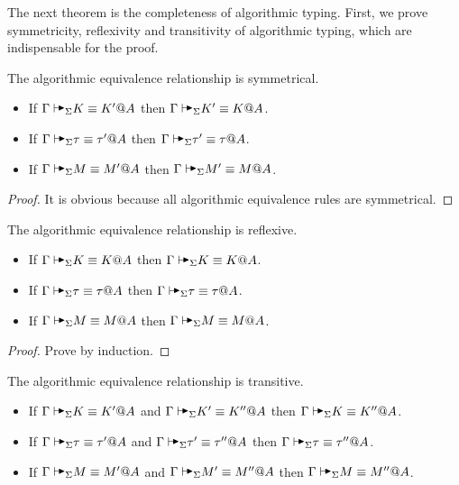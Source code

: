 The next theorem is the completeness of algorithmic typing. First, we prove
symmetricity, reflexivity and transitivity of algorithmic typing, which are
indispensable for the proof.

\begin{lemma}
    The algorithmic equivalence relationship is symmetrical.
    \label{lemma:SymmetricityinAlgorithmicEquivalence}
    \begin{itemize}
        \item If \( \G \AVS K \E K' @ A \) then \( \G \AVS K' \E K @ A \).
        \item If \( \G \AVS \tau \E \tau' @ A \) then \( \G \AVS \tau' \E \tau @ A \).
        \item If \( \G \AVS M \E M' @ A \) then \( \G \AVS M' \E M @ A \).
    \end{itemize}
\end{lemma}

\begin{proof}
    It is obvious because all algorithmic equivalence rules are symmetrical.
\end{proof}

\begin{lemma}
    The algorithmic equivalence relationship is reflexive.
    \label{lemma:ReflexivityinAlgorithmicEquivalence}
    \begin{itemize}
        \item If \( \G \AVS K \E K @ A \) then \( \G \AVS K \E K @ A \).
        \item If \( \G \AVS \tau \E \tau @ A \) then \( \G \AVS \tau \E \tau @ A \).
        \item If \( \G \AVS M \E M @ A \) then \( \G \AVS M \E M @ A \).
    \end{itemize}
\end{lemma}

\begin{proof}
    Prove by induction.
\end{proof}

\begin{lemma}
    The algorithmic equivalence relationship is transitive.
    \label{lemma:TransitioninAlgorithmicEquivalence}
    \begin{itemize}
        \item If \( \G \AVS K \E K' @ A \) and \( \G \AVS K' \E K'' @ A \) then \( \G \AVS K \E K'' @ A \).
        \item If \( \G \AVS \tau \E \tau' @ A \) and \( \G \AVS \tau' \E \tau'' @ A \) then \( \G \AVS \tau \E \tau'' @ A \).
        \item If \( \G \AVS M \E M' @ A \) and \( \G \AVS M' \E M'' @ A \) then \( \G \AVS M \E M'' @ A \).
    \end{itemize}
\end{lemma}

